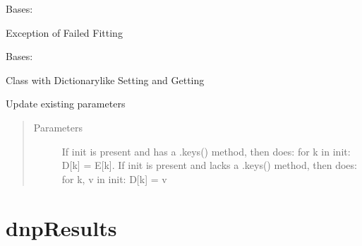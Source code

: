 \documentclass[letterpaper,10pt,english]{sphinxmanual}
\begin{document}
\begin{fulllineitems}
\label{\detokenize{dnpHydration:dnpLab.dnpHydration.FitError}}
Bases: 

Exception of Failed Fitting

\end{fulllineitems}


\begin{fulllineitems}
\label{\detokenize{dnpHydration:dnpLab.dnpHydration.AttrDict}}
Bases: 

Class with Dictionary\sphinxhyphen{}like Setting and Getting

\begin{fulllineitems}
\label{\detokenize{dnpHydration:dnpLab.dnpHydration.AttrDict.update}}
Update existing parameters
\begin{quote}\begin{description}
\item[{Parameters}] \leavevmode
{} \sphinxhyphen{}\sphinxhyphen{} If init is present and has a .keys() method,
then does: for k in init: D{[}k{]} = E{[}k{]}.
If init is present and lacks a .keys() method,
then does: for k, v in init: D{[}k{]} = v

\end{description}\end{quote}

\end{fulllineitems}


\end{fulllineitems}



\section{dnpResults}
\label{\detokenize{dnpResults:dnpresults}}\label{\detokenize{dnpResults::doc}}
\end{document}

